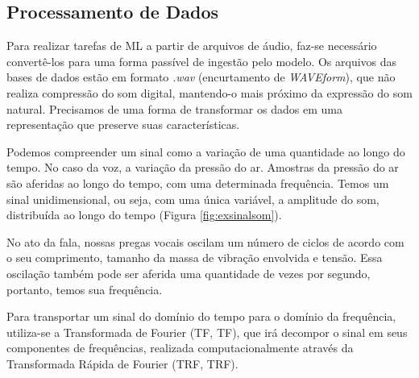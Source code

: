 \subsection{Processamento de Dados}\label{sec:procdados}

Para realizar tarefas de \acrshort{ML} a partir de arquivos de áudio, faz-se necessário convertê-los para uma forma passível de ingestão pelo modelo. Os arquivos das bases de dados estão em formato \textit{.wav} (encurtamento de \textit{WAVEform}), que não realiza compressão do som digital, mantendo-o mais próximo da expressão do som natural. Precisamos de uma forma de transformar os dados em uma representação que preserve suas características.

Podemos compreender um sinal como a variação de uma quantidade ao longo do tempo. No caso da voz, a variação da pressão do ar. Amostras da pressão do ar são aferidas ao longo do tempo, com uma determinada frequência. Temos um sinal unidimensional, ou seja, com uma única variável, a amplitude do som, distribuída ao longo do tempo (Figura \ref{fig:exsinalsom}).

No ato da fala, nossas pregas vocais oscilam um número de ciclos de acordo com o  seu comprimento, tamanho da massa de vibração envolvida e tensão. Essa oscilação também pode ser aferida uma quantidade de vezes por segundo, portanto, temos sua frequência.


Para transportar um sinal do domínio do tempo para o domínio da frequência, utiliza-se a Transformada de Fourier (\acrlong{TF}, \acrshort{TF}), que irá decompor o sinal em seus componentes de frequências, realizada computacionalmente através da Transformada Rápida de Fourier (\acrlong{TRF}, \acrshort{TRF}).


